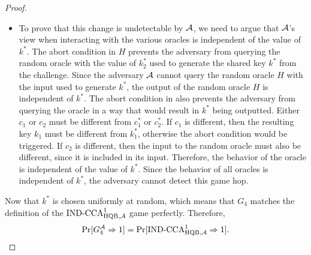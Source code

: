 \documentclass{article}
\begin{document}
\begin{proof}
\begin{itemize}
                                                                                                        \item[\emph{Proof}]
                                                                                                            To prove that this change is undetectable by $\mathcal{A}$, we need to argue that $\mathcal{A}$'s view when interacting with the various oracles is independent of the value of $k^*$.
                                                                                                            The abort condition in $H$ prevents the adversary from querying the random oracle with the value of $k^*_2$ used to generate the shared key $k^*$ from the challenge.
                                                                                                            Since the adversary $\mathcal{A}$ cannot query the random oracle $H$ with the input used to generate $k^*$, the output of the random oracle $H$ is independent of $k^*$.
                                                                                                            The abort condition in \dec also prevents the adversary from querying the \dec oracle in a way that would result in $k^*$ being outputted.
                                                                                                            Either $c_1$ or $c_2$ must be different from $c^*_1$ or $c^*_2$.
                                                                                                            If $c_1$ is different, then the resulting key $k_1$ must be different from $k^*_1$, otherwise the abort condition would be triggered.
                                                                                                            If $c_2$ is different, then the input to the random oracle must also be different, since it is included in its input.
                                                                                                            Therefore, the behavior of the \dec oracle is independent of the value of $k^*$.
                                                                                                            Since the behavior of all oracles is independent of $k^*$, the adversary cannot detect this game hop.
                                                                                                        \end{itemize}

                                                                                                    \item Now that $k^*$ is chosen uniformly at random, which means that $G_4$ matches the definition of the $\text{IND-CCA}^1_{\text{HQB},\mathcal{A}}$ game perfectly. Therefore,
                                                                                                        \[ \Pr[G^{\mathcal{A}}_4 \Rightarrow 1] = \Pr[\text{IND-CCA}^1_{\text{HQB},\mathcal{A}} \Rightarrow 1]. \]


\end{proof}
\end{document}

